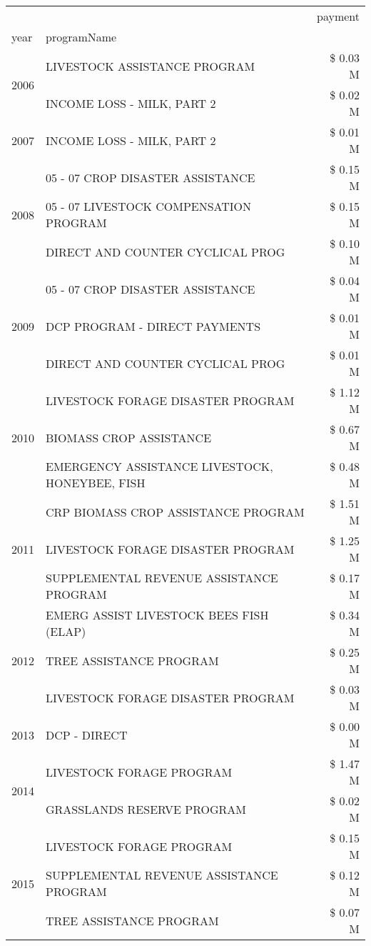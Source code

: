 \begin{tabular}{llr}
\toprule
 &  & payment \\
year & programName &  \\
\midrule
\multirow[t]{2}{*}{2006} & LIVESTOCK ASSISTANCE PROGRAM & \$ 0.03 M \\
 & INCOME LOSS - MILK, PART 2 & \$ 0.02 M \\
\cline{1-3}
2007 & INCOME LOSS - MILK, PART 2 & \$ 0.01 M \\
\cline{1-3}
\multirow[t]{3}{*}{2008} & 05 - 07 CROP DISASTER ASSISTANCE & \$ 0.15 M \\
 & 05 - 07 LIVESTOCK COMPENSATION PROGRAM & \$ 0.15 M \\
 & DIRECT AND COUNTER CYCLICAL PROG & \$ 0.10 M \\
\cline{1-3}
\multirow[t]{3}{*}{2009} & 05 - 07 CROP DISASTER ASSISTANCE & \$ 0.04 M \\
 & DCP PROGRAM - DIRECT PAYMENTS & \$ 0.01 M \\
 & DIRECT AND COUNTER CYCLICAL PROG & \$ 0.01 M \\
\cline{1-3}
\multirow[t]{3}{*}{2010} & LIVESTOCK FORAGE DISASTER  PROGRAM & \$ 1.12 M \\
 & BIOMASS CROP ASSISTANCE & \$ 0.67 M \\
 & EMERGENCY ASSISTANCE LIVESTOCK, HONEYBEE, FISH & \$ 0.48 M \\
\cline{1-3}
\multirow[t]{3}{*}{2011} & CRP BIOMASS CROP ASSISTANCE PROGRAM & \$ 1.51 M \\
 & LIVESTOCK FORAGE DISASTER PROGRAM & \$ 1.25 M \\
 & SUPPLEMENTAL REVENUE ASSISTANCE PROGRAM & \$ 0.17 M \\
\cline{1-3}
\multirow[t]{3}{*}{2012} & EMERG ASSIST LIVESTOCK BEES FISH (ELAP) & \$ 0.34 M \\
 & TREE ASSISTANCE PROGRAM & \$ 0.25 M \\
 & LIVESTOCK FORAGE DISASTER PROGRAM & \$ 0.03 M \\
\cline{1-3}
2013 & DCP - DIRECT & \$ 0.00 M \\
\cline{1-3}
\multirow[t]{2}{*}{2014} & LIVESTOCK FORAGE PROGRAM & \$ 1.47 M \\
 & GRASSLANDS RESERVE PROGRAM & \$ 0.02 M \\
\cline{1-3}
\multirow[t]{3}{*}{2015} & LIVESTOCK FORAGE PROGRAM & \$ 0.15 M \\
 & SUPPLEMENTAL REVENUE ASSISTANCE PROGRAM & \$ 0.12 M \\
 & TREE ASSISTANCE PROGRAM & \$ 0.07 M \\

\end{tabular}
